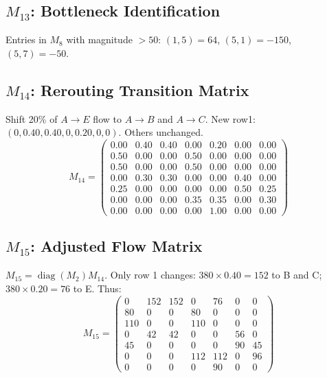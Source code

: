 \documentclass{ximera}
\begin{document}
\subsection*{\texorpdfstring{\(M_{13}\)}{M13}: Bottleneck Identification}
Entries in \(M_8\) with magnitude \(>50\): \((1,5)=64\), \((5,1)=-150\), \((5,7)=-50\).

\subsection*{\texorpdfstring{\(M_{14}\)}{M14}: Rerouting Transition Matrix}
Shift 20\% of \(A\rightarrow E\) flow to \(A\rightarrow B\) and \(A\rightarrow C\). New row1: \((0, 0.40, 0.40, 0, 0.20, 0, 0)\). Others unchanged.
\[
M_{14} = \begin{pmatrix}
0.00 & 0.40 & 0.40 & 0.00 & 0.20 & 0.00 & 0.00\\
0.50 & 0.00 & 0.00 & 0.50 & 0.00 & 0.00 & 0.00\\
0.50 & 0.00 & 0.00 & 0.50 & 0.00 & 0.00 & 0.00\\
0.00 & 0.30 & 0.30 & 0.00 & 0.00 & 0.40 & 0.00\\
0.25 & 0.00 & 0.00 & 0.00 & 0.00 & 0.50 & 0.25\\
0.00 & 0.00 & 0.00 & 0.35 & 0.35 & 0.00 & 0.30\\
0.00 & 0.00 & 0.00 & 0.00 & 1.00 & 0.00 & 0.00
\end{pmatrix}
\]

\subsection*{\texorpdfstring{\(M_{15}\)}{M15}: Adjusted Flow Matrix}
\(M_{15} = \operatorname{diag}(M_2) M_{14}\). Only row 1 changes:  
\(380\times0.40=152\) to B and C; \(380\times0.20=76\) to E.  
Thus:
\[
M_{15} = \begin{pmatrix}
0 & 152 & 152 & 0 & 76 & 0 & 0\\
80 & 0 & 0 & 80 & 0 & 0 & 0\\
110 & 0 & 0 & 110 & 0 & 0 & 0\\
0 & 42 & 42 & 0 & 0 & 56 & 0\\
45 & 0 & 0 & 0 & 0 & 90 & 45\\
0 & 0 & 0 & 112 & 112 & 0 & 96\\
0 & 0 & 0 & 0 & 90 & 0 & 0
\end{pmatrix}
\]
\end{document}
